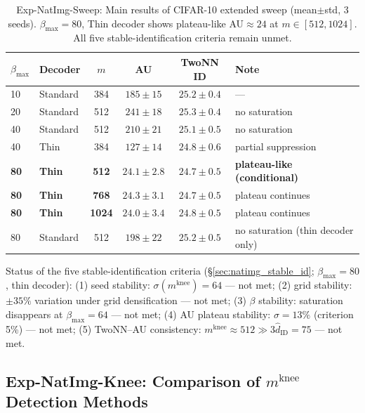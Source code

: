 \documentclass[make,article,submit,pdftex,moreauthors]{Definitions/mdpi}
\newcommand{\mknee}{m^{\mathrm{knee}}}
\begin{document}
\begin{table}[H]
\centering
\caption{Exp-NatImg-Sweep: Main results of CIFAR-10 extended sweep (mean$\pm$std, 3 seeds). $\beta_\mathrm{max}=80$, Thin decoder shows plateau-like AU$\approx24$ at $m \in [512,1024]$. All five stable-identification criteria remain unmet.}
\label{tab:natimg_sweep}
\small
\begin{tabular}{llcccl}
\toprule
$\beta_{\max}$ & Decoder & $m$ & AU & TwoNN ID & Note \\
\midrule
10 & Standard & 384 & $185\pm15$ & $25.2\pm0.4$ & --- \\
20 & Standard & 512 & $241\pm18$ & $25.3\pm0.4$ & no saturation \\
40 & Standard & 512 & $210\pm21$ & $25.1\pm0.5$ & no saturation \\
40 & Thin      & 384 & $127\pm14$ & $24.8\pm0.6$ & partial suppression \\
\textbf{80} & \textbf{Thin} & \textbf{512} & $\boldsymbol{24.1\pm2.8}$ & $24.7\pm0.5$ & \textbf{plateau-like (conditional)} \\
\textbf{80} & \textbf{Thin} & \textbf{768} & $\boldsymbol{24.3\pm3.1}$ & $24.7\pm0.5$ & plateau continues \\
\textbf{80} & \textbf{Thin} & \textbf{1024}& $\boldsymbol{24.0\pm3.4}$ & $24.8\pm0.5$ & plateau continues \\
80 & Standard  & 512 & $198\pm22$ & $25.2\pm0.5$ & no saturation (thin decoder only) \\
\bottomrule
\end{tabular}
\end{table}

Status of the five stable-identification criteria (\S\ref{sec:natimg_stable_id}; $\beta_{\max}=80$, thin decoder):
(1) seed stability: $\sigma(\mknee)=64$ --- not met;
(2) grid stability: $\pm35\%$ variation under grid densification --- not met;
(3) $\beta$ stability: saturation disappears at $\beta_{\max}=64$ --- not met;
(4) AU plateau stability: $\sigma=13\%$ (criterion 5\%) --- not met;
(5) TwoNN--AU consistency: $\mknee \approx 512 \gg 3\hat{d}_\mathrm{ID}=75$ --- not met.

\subsection*{Exp-NatImg-Knee: Comparison of $\mknee$ Detection Methods}
\end{document}
